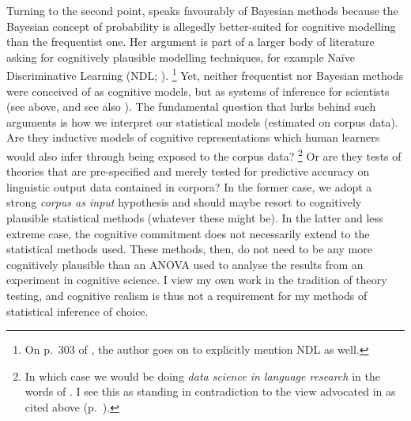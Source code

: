 Turning to the second point, \citet[301--302]{Divjak2016a} speaks favourably of Bayesian methods because the Bayesian concept of probability is allegedly better-suited for cognitive modelling than the frequentist one.
Her argument is part of a larger body of literature asking for cognitively plausible modelling techniques, for example Naïve Discriminative Learning (NDL; \citealt{Baayen2011,BaayenEa2013,MilinEa2016,TheijssenEa2013}).%
\footnote{On p.\ 303 of \citet{Divjak2016a}, the author goes on to explicitly mention NDL as well.}
Yet, neither frequentist nor Bayesian methods were conceived of as cognitive models, but as systems of inference for scientists (see above, and see also \citealt[302]{Divjak2016a}).
The fundamental question that lurks behind such arguments is how we interpret our statistical models (estimated on corpus data).
Are they inductive models of cognitive representations which human learners would also infer through being exposed to the corpus data?%
\footnote{In which case we would be doing \textit{data science in language research} in the words of \citealt{MilinEa2016}.
I see this as standing in contradiction to the view advocated in \citet{Dabrowska2016} as cited above (p.~\pageref{abs:dabrowska}).}
Or are they tests of theories that are pre-specified and merely tested for predictive accuracy on linguistic output data contained in corpora?
In the former case, we adopt a strong \textit{corpus as input} hypothesis \citep{StefanowitschFlach2016} and should maybe resort to cognitively plausible statistical methods (whatever these might be).
In the latter and less extreme case, the cognitive commitment does not necessarily extend to the statistical methods used.
These methods, then, do not need to be any more cognitively plausible than an ANOVA used to analyse the results from an experiment in cognitive science.
I view my own work in the tradition of theory testing, and cognitive realism is thus not a requirement for my methods of statistical inference of choice.

